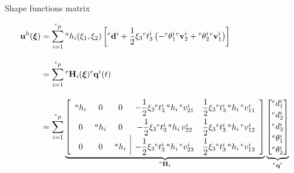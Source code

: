 \documentclass[aspectratio=169]{beamer}
\begin{document}
{
\color{white}
\begin{frame}{Shape functions matrix}
  \begin{block}{}\vspace{-0.5cm}
    \begin{align*}
      \mathbf u^h(\boldsymbol\xi) & =\sum_{i=1}^{{}^ep}{}^ah_i(\xi_1,\xi_2)\left[{}^e{\mathbf d}^i+\frac{1}{2}\xi_3{}^e t_3^i\left(-{}^e\theta_1^i{}^e\mathbf v_2^i+{}^e\theta_2^i{}^e\mathbf v_1^i\right)\right] \\[10pt]
                           & =\sum_{i=1}^{{}^ep}{}^e\mathbf H_i(\boldsymbol\xi){}^e\mathbf q^i(t)                                                                                                                 \\[10pt]
                           & =\sum_{i=1}^{{}^ep}\underbrace{\left[
          \begin{array}{ccc|cc}
            {}^a h_i                                                 & 0                                                       & 0        &
            -\dfrac{1}{2}\xi_3{}^e t_3^i \, {}^a h_i \, {}^ev_{21}^i & \dfrac{1}{2}\xi_3{}^e t_3^i \, {}^a h_i \, {}^ev_{11}^i                                                                                                                             \\[7pt]
            0                                                        & {}^a h_i                                                & 0        & -\dfrac{1}{2}\xi_3{}^e t_3^i \, {}^a h_i \, v_{22}^i & \dfrac{1}{2}\xi_3{}^e t_3^i \, {}^a h_i \, {}^ev_{12}^i \\[7pt]
            0                                                        & 0                                                       & {}^a h_i &
            -\dfrac{1}{2}\xi_3{}^e t_3^i \, {}^a h_i \, {}^ev_{23}^i & \dfrac{1}{2}\xi_3{}^e t_3^i \, {}^a h_i  \,{}^ev_{13}^i
          \end{array}
          \right]}_\text{${}^e\mathbf H_i$}
      \underbrace{\begin{bmatrix}
                      {}^e{d}^i_1 \\[2pt] {}^e{d}^i_2 \\[2pt] {}^e{d}^i_3 \\[2pt] {}^e{\theta}^i_1 \\[2pt] {}^e{\theta}^i_2
                    \end{bmatrix}}_\text{${}^e\mathbf q^i$}
    \end{align*}
  \end{block}
\end{frame}

}
\end{document}
